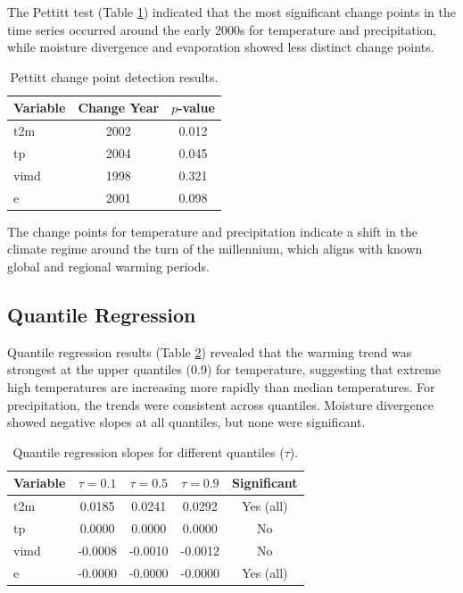\documentclass[12pt,a4paper]{article}
\begin{document}
The Pettitt test (Table \ref{tab:pettitt}) indicated that the most significant change points in the time series occurred around the early 2000s for temperature and precipitation, while moisture divergence and evaporation showed less distinct change points.

\begin{table}[H]
\centering
\caption{Pettitt change point detection results.}
\label{tab:pettitt}
\begin{tabular}{l c c}
\toprule
\textbf{Variable} & \textbf{Change Year} & \textbf{$p$-value} \\
\midrule
t2m & 2002 & 0.012 \\
tp & 2004 & 0.045 \\
vimd & 1998 & 0.321 \\
e & 2001 & 0.098 \\
\bottomrule
\end{tabular}
\end{table}

The change points for temperature and precipitation indicate a shift in the climate regime around the turn of the millennium, which aligns with known global and regional warming periods.

\subsection{Quantile Regression}

Quantile regression results (Table \ref{tab:quantile}) revealed that the warming trend was strongest at the upper quantiles (0.9) for temperature, suggesting that extreme high temperatures are increasing more rapidly than median temperatures. For precipitation, the trends were consistent across quantiles. Moisture divergence showed negative slopes at all quantiles, but none were significant.

\begin{table}[H]
\centering
\caption{Quantile regression slopes for different quantiles ($\tau$).}
\label{tab:quantile}
\begin{tabular}{l c c c c}
\toprule
\textbf{Variable} & \multicolumn{1}{c}{$\tau=0.1$} & \multicolumn{1}{c}{$\tau=0.5$} & \multicolumn{1}{c}{$\tau=0.9$} & \textbf{Significant} \\
\midrule
t2m & 0.0185 & 0.0241 & 0.0292 & Yes (all) \\
tp & 0.0000 & 0.0000 & 0.0000 & No \\
vimd & -0.0008 & -0.0010 & -0.0012 & No \\
e & -0.0000 & -0.0000 & -0.0000 & Yes (all) \\
\bottomrule
\end{tabular}
\end{table}
\end{document}

